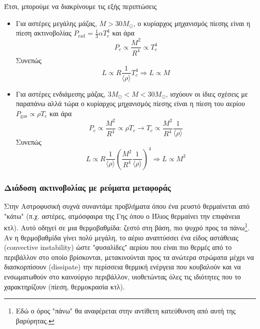 Έτσι, μπορούμε να διακρίνουμε τις εξής περιπτώσεις
\begin{itemize}
    \item Για αστέρες μεγάλης μάζας, $M>30M_\odot$, ο κυρίαρχος μηχανισμός πίεσης είναι η πίεση ακτινοβολίας $P_{\text{rad}} = \frac{1}{3} \alpha T_c^4$ και άρα
    \begin{equation*}
        P_c \propto \frac{M^2}{R^4} \propto T_c^4
    \end{equation*}
    Συνεπώς
    \begin{equation}
        \label{eq:high_mass_LM_relationship}
        L \propto R \frac{1}{\langle \rho \rangle} T_c^4 \Rightarrow \boxed{L \propto M}
    \end{equation}
    
    \item Για αστέρες ενδιάμεσης μάζας, $3M_\odot < M < 30M_\odot$, ισχύουν οι ίδιες σχέσεις με παραπάνω αλλά τώρα ο κυρίαρχος μηχανισμός πίεσης είναι η πίεση του αερίου $P_{\text{gas}} \propto \rho T_c$ και άρα
    \begin{equation*}
        P_c \propto \frac{M^2}{R^4} \propto \rho T_c \longrightarrow T_c \propto \frac{M^2}{R^4} \frac{1}{\langle \rho \rangle}
    \end{equation*}
    Συνεπώς
    \begin{equation}
        \label{eq:intermediate_mass_LM_relationship}
        L \propto R \frac{1}{\langle \rho \rangle} \left(\frac{M^2}{R^4} \frac{1}{\langle \rho \rangle} \right)^4 \Rightarrow \boxed{L \propto M^3}
    \end{equation}
\end{itemize}
\subsubsection{Διάδοση ακτινοβολίας με ρεύματα μεταφοράς}
Στην Αστροφυσική συχνά συναντάμε προβλήματα όπου ένα ρευστό θερμαίνεται από "κάτω" (π.χ. αστέρες, ατμόσφαιρα της Γης όπου ο Ήλιος θερμαίνει την επιφάνεια κτλ). Αυτό οδηγεί σε μια θερμοβαθμίδα: ζεστό στη βάση, πιο ψυχρό προς τα πάνω\footnote{Εδώ ο όρος "πάνω" θα αναφέρεται στην αντίθετη κατεύθυνση από αυτή της βαρύρητας.}. Αν η θερμοβαθμίδα γίνει πολύ μεγάλη, το αέριο αναπτύσσει ένα είδος αστάθειας (convective instability) ώστε "φυσαλίδες" αερίου που είναι πιο θερμές από το περιβάλλον στο οποίο βρίσκονται, μετακινούνται προς τα ανώτερα στρώματα μέχρι να διασκορπίσουν (dissipate) την περίσσεια θερμική ενέργεια που κουβαλούν και να ενσωματωθούν στο καινούργιο περιβάλλον, υιοθετώντας όλες τις ιδιότητες που το χαρακτηρίζουν (πίεση, θερμοκρασία κτλ). 

